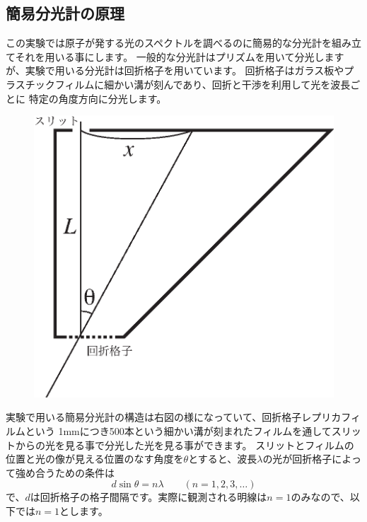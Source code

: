 
\subsection{簡易分光計の原理}

この実験では原子が発する光のスペクトルを調べるのに簡易的な分光計を組み立てそれを用いる事にします。
一般的な分光計はプリズムを用いて分光しますが、実験で用いる分光計は回折格子を用いています。
回折格子はガラス板やプラスチックフィルムに細かい溝が刻んであり、回折と干渉を利用して光を波長ごとに
特定の角度方向に分光します。

\begin{figure}
\vspace*{-0.8cm}
\includegraphics[scale=0.6]{12_Spectrum/spectroscope.eps}
\end{figure}


実験で用いる簡易分光計の構造は右図の様になっていて、回折格子レプリカフィルムという
1mmにつき500本という細かい溝が刻まれたフィルムを通してスリットからの光を見る事で分光した光を見る事ができます。
スリットとフィルムの位置と光の像が見える位置のなす角度を$\theta$とすると、波長$\lambda$の光が回折格子によって強め合うための条件は
\[
d \sin \theta = n \lambda \qquad (n=1,2,3,\ldots)
\]
で、$d$は回折格子の格子間隔です。実際に観測される明線は$n=1$のみなので、以下では$n=1$とします。


